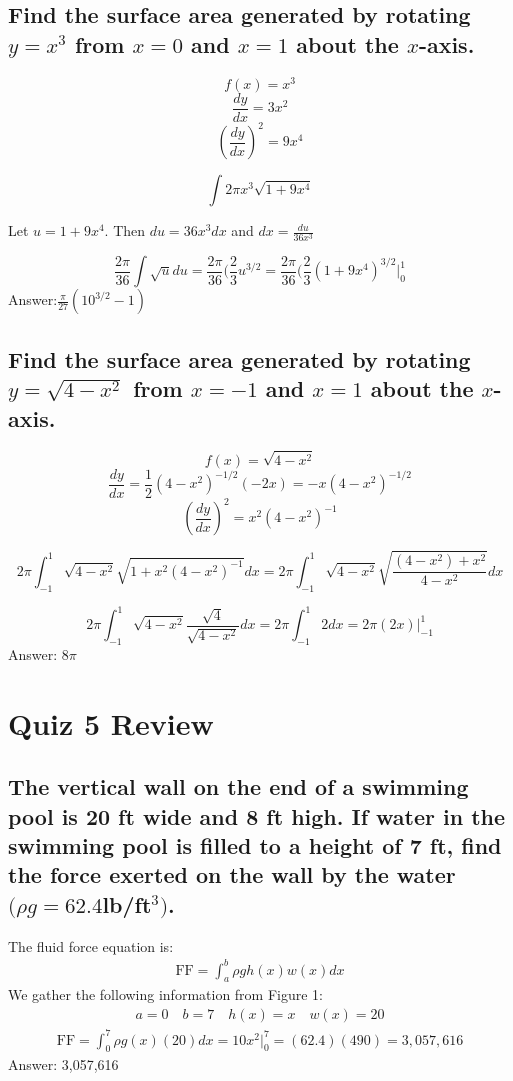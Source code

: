 \documentclass{article}
\begin{document}
\subsection{Find the surface area generated by rotating $y = x^3$ from $x = 0$ and $x = 1$ about the $x$-axis.}

\[f(x) = x^3\]
\[\frac{dy}{dx} =3x^2\]
\[(\frac{dy}{dx})^2 = 9x^4\]

\bigskip

\[\int 2\pi x^3 \sqrt{1+9x^4}\]

Let $u = 1+9x^4$. Then $du = 36x^3 dx$ and $dx = \frac{du}{36x^3}$

\[\frac{2\pi}{36}  \int \sqrt{u} du = \frac{2\pi}{36}(\frac{2}{3} u^{3/2} = \frac{2\pi}{36}(\frac{2}{3} (1+9x^4) ^{3/2}\Big|_{0}^{1} \]
Answer:$ \frac{\pi}{27}(10^{3/2} -1)$

\subsection{Find the surface area generated by rotating $y = \sqrt{4 - x^2}$ from $x = -1$ and $x = 1$ about the $x$-axis.}

\[f(x) = \sqrt{4 - x^2}\]
\[\frac{dy}{dx} =\frac{1}{2}(4-x^2)^{-1/2}(-2x) = -x(4-x^2)^{-1/2}\]
\[(\frac{dy}{dx})^2 = x^2(4-x^2)^{-1}\]

\bigskip

\[ 2\pi \int_{-1}^1 \sqrt{4 - x^2}\sqrt{1+x^2(4-x^2)^{-1}} dx = 2\pi \int_{-1}^1\sqrt{4 - x^2}\sqrt{\frac{(4-x^2)+x^2}{4-x^2}} dx \]

\[ 2\pi \int_{-1}^1 \sqrt{4 - x^2} \frac{\sqrt{4}}{\sqrt{4-x^2}} dx = 2 \pi \int_{-1}^1 2dx = 2 \pi (2x) \Big|_{-1}^{1} \]
Answer: $8\pi$









\newpage
\section{Quiz 5 Review}
\subsection{The vertical wall on the end of a swimming pool is 20 ft wide and 8 ft high. If water in the swimming pool is filled to a height of 7 ft, find the force exerted on the wall by the water $(\rho g = 62.4 $lb/ft$^3)$.}
The fluid force equation is:
\begin{align*}
	\text{FF} = \int_a^b {\rho g h(x) w(x) dx}
\end{align*}
We gather the following information from Figure 1:
\begin{align*}
	a = 0 \quad b = 7 \quad h(x) = x \quad w(x) = 20
\end{align*}
\begin{align*}
	\text{FF} = \int_0^7 {\rho g (x)(20)}dx = 10x^2 \bigg|_0^7 = (62.4)(490) = 3,057,616
\end{align*}
Answer: 3,057,616
\end{document}
